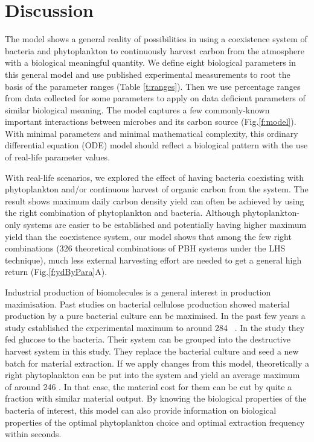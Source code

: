 \documentclass[../thesis.tex]{subfiles} %
\begin{document}
\section{Discussion}
The model shows a general reality of possibilities in using a coexistence system of bacteria and phytoplankton to continuously harvest carbon from the atmosphere with a biological meaningful quantity.  We define eight biological parameters in this general model and use published experimental measurements to root the basis of the parameter ranges (Table \ref{t:ranges}).  Then we use percentage ranges from data collected for some parameters to apply on data deficient parameters of similar biological meaning.  The model captures a few commonly-known important interactions between microbes and its carbon source (Fig.\ref{f:model}).  With minimal parameters and minimal mathematical complexity, this ordinary differential equation (ODE) model should reflect a biological pattern with the use of real-life parameter values.

With real-life scenarios, we explored the effect of having bacteria coexisting with phytoplankton and/or continuous harvest of organic carbon from the system.  The result shows maximum daily carbon density yield can often be achieved by using the right combination of phytoplankton and bacteria.  Although phytoplankton-only systems are easier to be established and potentially having higher maximum yield than the coexistence system, our model shows that among the few right combinations (326 theoretical combinations of PBH systems under the LHS technique), much less external harvesting effort are needed to get a general high return (Fig.\ref{f:ydByPara}A).

Industrial production of biomolecules is a general interest in production maximisation.  Past studies on bacterial cellulose production showed material production by a pure bacterial culture can be maximised.  In the past few years a study established the experimental maximum to around 284 \dxdt\ \autocite{aytekin2016statistical}.  In the study they fed glucose to the bacteria.  Their system can be grouped into the destructive harvest system in this study.  They replace the bacterial culture and seed a new batch for material extraction.  If we apply changes from this model, theoretically a right phytoplankton can be put into the system and yield an average maximum of around 246 \dxdt.  In that case, the material cost for them can be cut by quite a fraction with similar material output.  By knowing the biological properties of the bacteria of interest, this model can also provide information on biological properties of the optimal phytoplankton choice and optimal extraction frequency within seconds.
\end{document}
